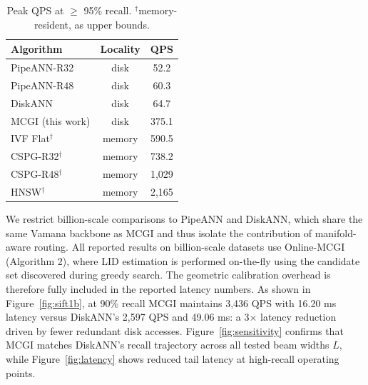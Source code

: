 \documentclass{article}
\theoremstyle{plain}
\theoremstyle{definition}
\theoremstyle{remark}
\newcommand{\ours}{MCGI\xspace}
\begin{document}
\begin{table}
\vspace{-4mm}
\centering
\small
\setlength{\tabcolsep}{4pt}
\caption{Peak QPS at $\ge$ 95\% recall. $^\dagger$memory-resident, as upper bounds.}
\label{tab:high_recall}
\begin{tabular}{lcc}
\toprule
Algorithm & Locality & QPS \\
\midrule
PipeANN-R32~\cite{osdi25pipeann} & disk & 52.2 \\
PipeANN-R48~\cite{osdi25pipeann} & disk & 60.3 \\
DiskANN~\cite{subramanya2019diskann} & disk & 64.7 \\
MCGI (this work) & disk & 375.1 \\
\midrule
IVF Flat$^\dagger$~\cite{johnson2019billion} & memory & 590.5 \\
CSPG-R32$^\dagger$~\cite{NEURIPS2024_bab1486c} & memory & 738.2 \\
CSPG-R48$^\dagger$~\cite{NEURIPS2024_bab1486c} & memory & 1,029 \\
HNSW$^\dagger$~\cite{malkov2018efficient} & memory & 2,165 \\
\bottomrule
\end{tabular}
\end{table}
We restrict billion-scale comparisons to PipeANN and DiskANN, which share the same Vamana backbone as \ours{} and thus isolate the contribution of manifold-aware routing. 
All reported results on billion-scale datasets use Online-MCGI (Algorithm 2), where LID estimation is performed on-the-fly using the candidate set discovered during greedy search. The geometric calibration overhead is therefore fully included in the reported latency numbers.
As shown in Figure~\ref{fig:sift1b}, at 90\% recall \ours{} maintains 3,436 QPS with 16.20 ms latency versus DiskANN's 2,597 QPS and 49.06 ms: a 3$\times$ latency reduction driven by fewer redundant disk accesses. Figure~\ref{fig:sensitivity} confirms that \ours{} matches DiskANN's recall trajectory across all tested beam widths $L$, while Figure~\ref{fig:latency} shows reduced tail latency at high-recall operating points.
\end{document}
